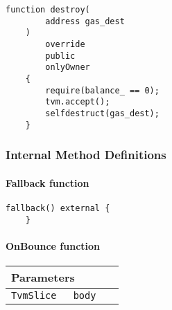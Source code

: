 \vspace{2cm}

\begin{lstlisting}[firstnumber=584]
    function destroy(
        address gas_dest
    )
        override
        public
        onlyOwner
    {
        require(balance_ == 0);
        tvm.accept();
        selfdestruct(gas_dest);
    }
\end{lstlisting}

\subsubsection{Internal Method Definitions}


\paragraph{Fallback function}

\vspace{2cm}

\begin{lstlisting}[firstnumber=683]
    fallback() external {
    }
\end{lstlisting}

\paragraph{OnBounce function}


\ifsoltables
\noindent\begin{tabular}{|l|l|p{5cm}|}\hline
\multicolumn{3}{|l|}{\bf Parameters}\\\hline
\tt TvmSlice & \tt body &\\\hline
\end{tabular}
\fi

\vspace{2cm}

